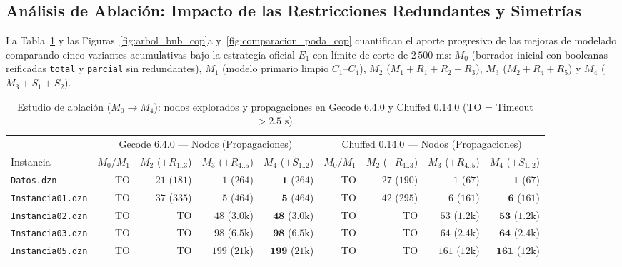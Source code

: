 \subsection{Análisis de Ablación: Impacto de las Restricciones Redundantes y Simetrías}

La Tabla~\ref{tab:ablacion_cop} y las Figuras~\ref{fig:arbol_bnb_cop}a y~\ref{fig:comparacion_poda_cop} cuantifican el aporte progresivo de las mejoras de modelado comparando cinco variantes acumulativas bajo la estrategia oficial $E_1$ con límite de corte de $2\,500\text{ ms}$: $M_0$ (borrador inicial con booleanas reificadas \texttt{total} y \texttt{parcial} sin redundantes), $M_1$ (modelo primario limpio $C_1$--$C_4$), $M_2$ ($M_1 + R_1 + R_2 + R_3$), $M_3$ ($M_2 + R_4 + R_5$) y $M_4$ ($M_3 + S_1 + S_2$).

\begin{table}[htbp]
    \centering
    \scriptsize
    \setlength{\tabcolsep}{1.8pt}
    \caption{Estudio de ablación ($M_0 \to M_4$): nodos explorados y propagaciones en Gecode 6.4.0 y Chuffed 0.14.0 (TO = Timeout $> 2.5\text{ s}$).}
    \label{tab:ablacion_cop}
    \begin{tabular}{lrrrrrrrr}
        \toprule
        & \multicolumn{4}{c}{Gecode 6.4.0 — Nodos (Propagaciones)} & \multicolumn{4}{c}{Chuffed 0.14.0 — Nodos (Propagaciones)} \\
        \cmidrule(lr){2-5} \cmidrule(lr){6-9}
        Instancia & $M_0 / M_1$ & $M_2$ ($+R_{1..3}$) & $M_3$ ($+R_{4..5}$) & $M_4$ ($+S_{1..2}$) & $M_0 / M_1$ & $M_2$ ($+R_{1..3}$) & $M_3$ ($+R_{4..5}$) & $M_4$ ($+S_{1..2}$) \\
        \midrule
        \texttt{Datos.dzn}       & TO & $21$ ($181$) & $1$ ($264$) & $\mathbf{1}$ ($264$) & TO & $27$ ($190$) & $1$ ($67$) & $\mathbf{1}$ ($67$) \\
        \texttt{Instancia01.dzn} & TO & $37$ ($335$) & $5$ ($464$) & $\mathbf{5}$ ($464$) & TO & $42$ ($295$) & $6$ ($161$) & $\mathbf{6}$ ($161$) \\
        \texttt{Instancia02.dzn} & TO & TO           & $48$ ($3.0\text{k}$) & $\mathbf{48}$ ($3.0\text{k}$) & TO & TO & $53$ ($1.2\text{k}$) & $\mathbf{53}$ ($1.2\text{k}$) \\
        \texttt{Instancia03.dzn} & TO & TO           & $98$ ($6.5\text{k}$) & $\mathbf{98}$ ($6.5\text{k}$) & TO & TO & $64$ ($2.4\text{k}$) & $\mathbf{64}$ ($2.4\text{k}$) \\
        \texttt{Instancia05.dzn} & TO & TO           & $199$ ($21\text{k}$) & $\mathbf{199}$ ($21\text{k}$) & TO & TO & $161$ ($12\text{k}$) & $\mathbf{161}$ ($12\text{k}$) \\

\end{tabular}
\end{table}
